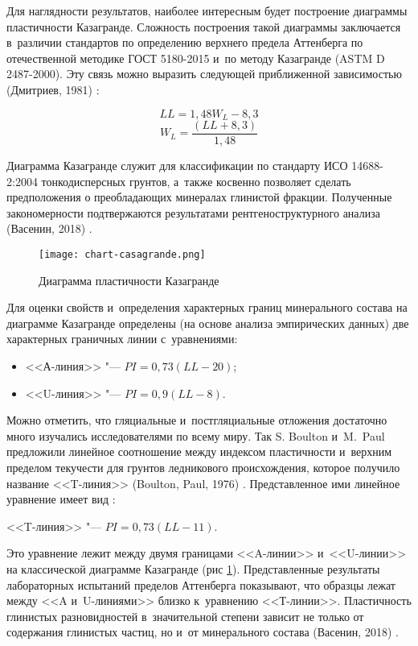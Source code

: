 Для наглядности результатов, наиболее интересным будет построение диаграммы пластичности Казагранде. Сложность построения такой диаграммы заключается в~различии  стандартов по определению верхнего предела Аттенберга по отечественной методике ГОСТ 5180-2015 и~по методу Казагранде (ASTM D 2487-2000). Эту связь можно выразить следующей приближенной зависимостью (Дмитриев, 1981) \cite{dmitriev1981}:

$$LL = 1,48W_L - 8,3$$
$$W_L = {\frac{(LL + 8,3)}{1,48}}$$

Диаграмма Казагранде служит для классификации по стандарту ИСО 14688-2:2004 тонкодисперсных грунтов, а~также косвенно позволяет сделать предположения о преобладающих минералах глинистой фракции. Полученные закономерности подтвержаются результатами рентгеноструктурного анализа (Васенин, 2018) \cite{vasenin2018}.


\begin{figure}[ht]
    \small
    \centering
    \texttt{[image: chart-casagrande.png]}
    \caption{Диаграмма пластичности Казагранде} \label{Fig:Caz}
  \end{figure}


Для оценки свойств и~определения характерных границ минерального состава на диаграмме Казагранде определены (на основе анализа эмпирических данных) две характерных граничных линии с~уравнениями:

\begin{itemize}
    \item <<А-линия>> "--- $PI = 0,73(LL - 20)$;
    \item <<U-линия>> "--- $PI = 0,9(LL - 8)$.
\end{itemize}

Можно отметить, что гляциальные и~постгляциальные отложения достаточно много изучались исследователями по всему миру. Так S. Boulton и~M.~Paul  предложили линейное соотношение между  индексом пластичности и~верхним пределом текучести  для грунтов ледникового происхождения, которое получило название <<T-линия>> (Boulton, Paul, 1976) \cite{boulton1976}. Представленное ими линейное уравнение имеет вид :

<<T-линия>> "--- $PI = 0,73(LL-11)$.

Это уравнение лежит между двумя границами <<A-линии>> и~<<U-линии>> на классической диаграмме Казагранде (рис \ref{Fig:Caz}). Представленные результаты лабораторных испытаний пределов Аттенберга показывают, что образцы лежат между <<A и~U-линиями>> близко к~уравнению <<Т-линии>>. Пластичность глинистых разновидностей в~значительной степени зависит не только от содержания глинистых частиц, но и~от минерального состава (Васенин, 2018) \cite{vasenin2018}.

